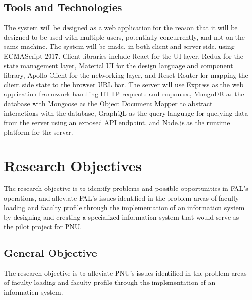 
\subsection{Tools and Technologies}
The system will be designed as a web application for the reason that it will be designed to be used with multiple users, potentially concurrently, and not on the same machine. The system will be made, in both client and server side, using ECMAScript 2017. Client libraries include React for the UI layer, Redux for the state management layer, Material UI for the design language and component library, Apollo Client for the networking layer, and React Router for mapping the client side state to the browser URL bar. The server will use Express as the web application framework handling HTTP requests and responses, MongoDB as the database with Mongoose as the Object Document Mapper to abstract interactions with the database, GraphQL as the query language for querying data from the server using an exposed API endpoint, and Node.js as the runtime platform for the server.

\section{Research Objectives}
The research objective is to identify problems and possible opportunities in FAL's operations, and alleviate FAL's issues identified in the problem areas of faculty loading and faculty profile through the implementation of an information system by designing and creating a specialized information system that would serve as the pilot project for PNU.

\subsection{General Objective}
The research objective is to alleviate PNU's issues identified in the problem areas of faculty loading and faculty profile through the implementation of an information system.


